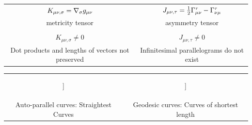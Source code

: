 \documentclass[submitted]{article}
\begin{document}
\footnotesize
\begin{infobox}
\begin{center}
\begin{tabular}{cc}
 $K_{\mu \nu, \sigma} = \nabla_{\sigma} g_{\mu\nu}$ & $J_{\mu\nu,\tau}=\frac{1}{2} \Gamma^\tau_{\mu\nu}-\Gamma^\tau_{\nu\mu}$ \\
metricity tensor & asymmetry tensor \\ \\
 $K_{\mu \nu, \sigma} \neq 0$ & $J_{\mu\nu,\tau} \neq 0$ \\

Dot products and lengths of vectors not preserved & Infinitesimal parallelograms do not exist

 \end{tabular}
 \end{center}
\end{infobox}
\begin{infobox}
\begin{center}
\begin{tabular}{cc}
\begin{forest}
[{$\begin{array}{c}\text{Displacement Space} \\ K_{\mu \nu, \sigma} \neq 0 \end{array}$} [{$\begin{array}{c}\text{Weyl geometry} \\ \Gtmn=\Gtnm \end{array}$}] [{$\Gtmn\neq\Gtnm$}]]
\end{forest} 

&

\begin{forest}
[{$\begin{array}{c}\text{Metrical Space} \\ K_{\mu \nu, \sigma} = 0\end{array}$} [{$\begin{array}{c}\text{Riemann Geometry} \\ \Gtmn=\Gtnm \end{array}$}] [{$\begin{array}{c}\text{Reichenbach Geometry} \\ \Gtmn\neq\Gtnm \end{array}$}\hide{[{$\begin{array}{c}\text{Einstein Geometry} \\ \ritea=0 \end{array}$}]}]]
\end{forest} \\
Auto-parallel curves: Straightest Curves & Geodesic curves: Curves of shortest length 

\end{tabular}
\end{center}
\end{infobox}
\end{document}
